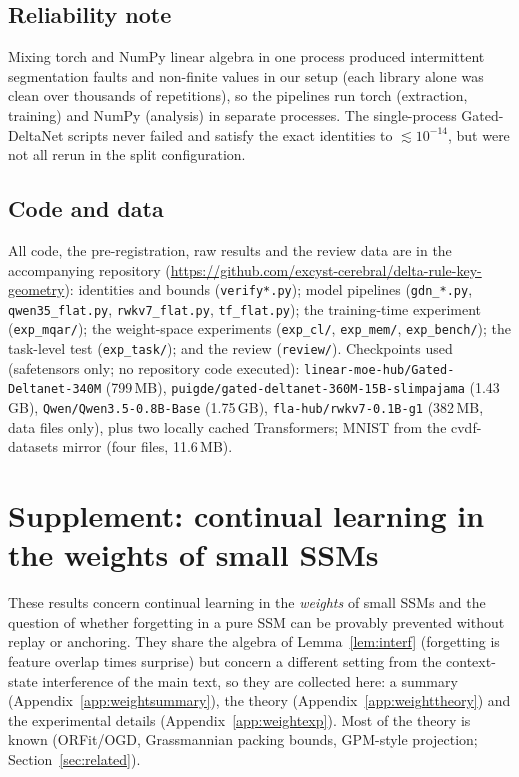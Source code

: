 \subsection{Reliability note}
Mixing torch and NumPy linear algebra in one process produced intermittent segmentation faults and non-finite values in our setup (each library alone was clean over thousands of repetitions), so the pipelines run torch (extraction, training) and NumPy (analysis) in separate processes. The single-process Gated-DeltaNet scripts never failed and satisfy the exact identities to $\lesssim10^{-14}$, but were not all rerun in the split configuration.

\subsection{Code and data}
\begin{sloppypar}
All code, the pre-registration, raw results and the review data are in the accompanying repository (\url{https://github.com/excyst-cerebral/delta-rule-key-geometry}): identities and bounds (\texttt{verify*.py}); model pipelines (\texttt{gdn\_*.py}, \texttt{qwen35\_flat.py}, \texttt{rwkv7\_flat.py}, \texttt{tf\_flat.py}); the training-time experiment (\texttt{exp\_mqar/}); the weight-space experiments (\texttt{exp\_cl/}, \texttt{exp\_mem/}, \texttt{exp\_bench/}); the task-level test (\texttt{exp\_task/}); and the review (\texttt{review/}). Checkpoints used (safetensors only; no repository code executed): \texttt{linear-moe-hub/Gated-Deltanet-340M} (799\,MB), \texttt{puigde/gated-deltanet-360M-15B-slimpajama} (1.43\,GB), \texttt{Qwen/Qwen3.5-0.8B-Base} (1.75\,GB), \texttt{fla-hub/rwkv7-0.1B-g1} (382\,MB, data files only), plus two locally cached Transformers; MNIST from the cvdf-datasets mirror (four files, 11.6\,MB).
\end{sloppypar}

\bigskip
\section*{Supplement: continual learning in the weights of small SSMs}
These results concern continual learning in the \emph{weights} of small SSMs and the question of whether forgetting in a pure SSM can be provably prevented without replay or anchoring. They share the algebra of Lemma~\ref{lem:interf} (forgetting is feature overlap times surprise) but concern a different setting from the context-state interference of the main text, so they are collected here: a summary (Appendix~\ref{app:weightsummary}), the theory (Appendix~\ref{app:weighttheory}) and the experimental details (Appendix~\ref{app:weightexp}). Most of the theory is known (ORFit/OGD, Grassmannian packing bounds, GPM-style projection; Section~\ref{sec:related}).

